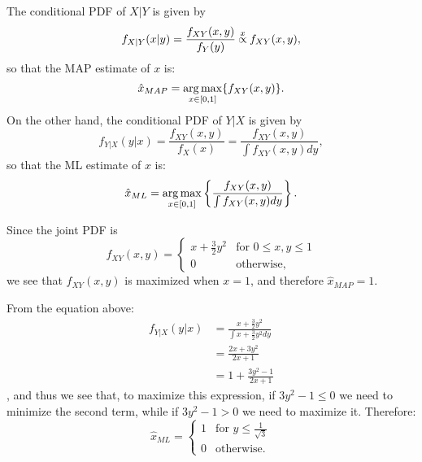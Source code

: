 \begin{problem}{3}  The conditional PDF of $X|Y$ is given by
\begin{equation*}
f_{X|Y}(x|y) = \frac{f_{XY}(x,y)}{f_{Y}(y)} \propof{x} f_{XY}(x,y),
\end{equation*}
so that the MAP estimate of $x$ is:
\begin{equation*}
\hat x_{MAP} = \operatorname*{arg\,max}_{x \in [0, 1]} \{ f_{XY}(x,y)\}.
\end{equation*}
On the other hand, the conditional PDF of $Y|X$ is given by
\begin{equation*}
f_{Y|X}(y|x) = \frac{f_{XY}(x,y)}{f_{X}(x)} = \frac{f_{XY}(x,y)}{\int f_{XY}(x,y)dy}, 
\end{equation*}
so that the ML estimate of $x$ is:
\begin{equation*}
\hat x_{ML} = \operatorname*{arg\,max}_{x \in [0, 1]}\left  \{ \frac{f_{XY}(x,y)}{\int f_{XY}(x,y)dy} \right \}.
\end{equation*}

Since the joint PDF is
\[
  f_{XY}(x,y) =
  \begin{cases}
                                   x+\frac{3}{2}y^2 & \text{for $0 \le x,y\le 1$} \\
                                   0 & \text{otherwise},
  \end{cases}
\]
we see that $ f_{XY}(x,y)$ is maximized when $x = 1$, and therefore $\hat x_{MAP} = 1$.

From the equation above:
\begin{align*}
f_{Y|X}(y|x) &=\frac{x+\frac{3}{2}y^2}{\int x+\frac{3}{2}y^2dy} \\
& = \frac{2x+3y^2}{2x+1} \\
&=1+\frac{3y^2-1}{2x+1}
\end{align*},
and thus we see that, to maximize this expression, if $3y^2-1\le 0$ we need to minimize the second term, while if $3y^2-1> 0$ we need to maximize it.  Therefore:
\[
  \hat x_{ML} =
  \begin{cases}
                                   1 & \text{for $y \le \frac{1}{\sqrt{3}}$} \\
                                   0 & \text{otherwise}.
  \end{cases}
\]


\end{problem}


